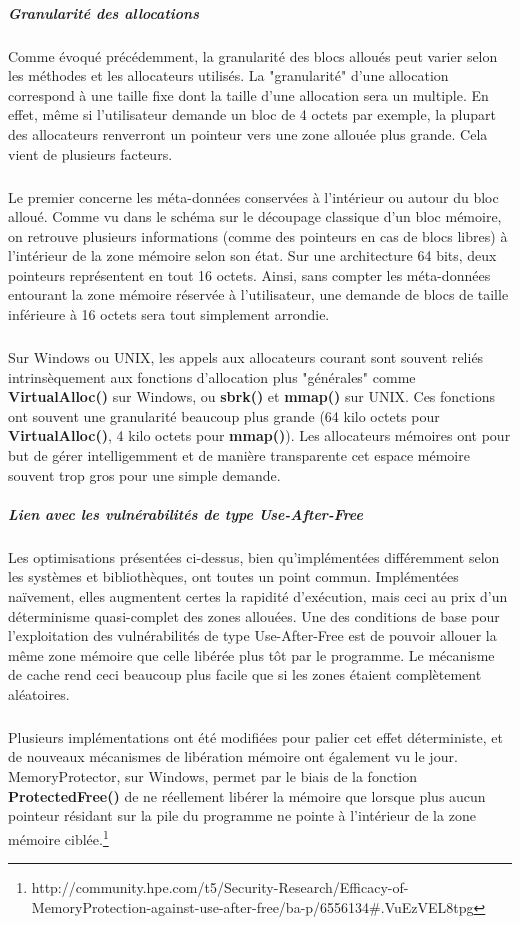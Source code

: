 \subparagraph{Granularité des allocations}
Comme évoqué précédemment, la granularité des blocs alloués peut varier selon les méthodes et les allocateurs utilisés. La "granularité" d'une allocation
correspond à une taille fixe dont la taille d'une allocation sera un multiple. En effet, même si l'utilisateur demande un bloc de 4 octets par exemple, la plupart
des allocateurs renverront un pointeur vers une zone allouée plus grande. Cela vient de plusieurs facteurs.

\subparagraph{}
Le premier concerne les méta-données conservées à l'intérieur ou autour du bloc alloué. Comme vu dans le schéma sur le découpage classique d'un bloc mémoire,
on retrouve plusieurs informations (comme des pointeurs en cas de blocs libres) à l'intérieur de la zone mémoire selon son état. Sur une architecture 64 bits,
deux pointeurs représentent en tout 16 octets. Ainsi, sans compter les méta-données entourant la zone mémoire réservée à l'utilisateur, une demande de blocs de taille
inférieure à 16 octets sera tout simplement arrondie.
\subparagraph{}
Sur Windows ou UNIX, les appels aux allocateurs courant sont souvent reliés intrinsèquement aux fonctions d'allocation plus "générales" comme  \textbf{VirtualAlloc()} sur
Windows, ou \textbf{sbrk()} et \textbf{mmap()} sur UNIX. Ces fonctions ont souvent une granularité beaucoup plus grande (64 kilo octets pour \textbf{VirtualAlloc()}, 4 kilo octets
pour \textbf{mmap()}). Les allocateurs mémoires ont pour but de gérer intelligemment et de manière transparente cet espace mémoire souvent trop gros pour une simple demande.

\subparagraph{Lien avec les vulnérabilités de type Use-After-Free}
Les optimisations présentées ci-dessus, bien qu'implémentées différemment selon les systèmes et bibliothèques, ont toutes un point commun.
Implémentées naïvement, elles augmentent certes la rapidité d'exécution, mais ceci au prix d'un déterminisme quasi-complet des zones allouées.
Une des conditions de base pour l'exploitation des vulnérabilités de type Use-After-Free est de pouvoir allouer la même zone mémoire que celle libérée plus tôt par le programme.
Le mécanisme de cache rend ceci beaucoup plus facile que si les zones étaient complètement aléatoires.

\subparagraph{}
Plusieurs implémentations ont été modifiées pour palier cet effet déterministe, et de nouveaux mécanismes de libération mémoire ont également vu le jour.
MemoryProtector, sur Windows, permet par le biais de la fonction \textbf{ProtectedFree()} de ne réellement libérer la mémoire que lorsque plus aucun pointeur
résidant sur la pile du programme ne pointe à l'intérieur de la zone mémoire ciblée.\footnote{http://community.hpe.com/t5/Security-Research/Efficacy-of-MemoryProtection-against-use-after-free/ba-p/6556134\#.VuEzVEL8tpg}


